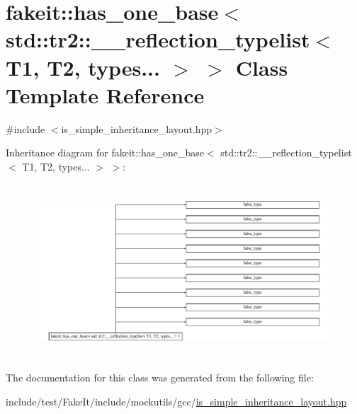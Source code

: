 \hypertarget{classfakeit_1_1has__one__base_3_01std_1_1tr2_1_1____reflection__typelist_3_01T1_00_01T2_00_01types_8_8_8_01_4_01_4}{}\section{fakeit\+::has\+\_\+one\+\_\+base$<$ std\+::tr2\+::\+\_\+\+\_\+reflection\+\_\+typelist$<$ T1, T2, types... $>$ $>$ Class Template Reference}
\label{classfakeit_1_1has__one__base_3_01std_1_1tr2_1_1____reflection__typelist_3_01T1_00_01T2_00_01types_8_8_8_01_4_01_4}


{\ttfamily \#include $<$is\+\_\+simple\+\_\+inheritance\+\_\+layout.\+hpp$>$}

Inheritance diagram for fakeit\+::has\+\_\+one\+\_\+base$<$ std\+::tr2\+::\+\_\+\+\_\+reflection\+\_\+typelist$<$ T1, T2, types... $>$ $>$\+:\begin{figure}[H]
\begin{center}
\leavevmode
\includegraphics[height=6.511628cm]{classfakeit_1_1has__one__base_3_01std_1_1tr2_1_1____reflection__typelist_3_01T1_00_01T2_00_01types_8_8_8_01_4_01_4}
\end{center}
\end{figure}


The documentation for this class was generated from the following file\+:\begin{DoxyCompactItemize}
\item 
include/test/\+Fake\+It/include/mockutils/gcc/\mbox{\hyperlink{is__simple__inheritance__layout_8hpp}{is\+\_\+simple\+\_\+inheritance\+\_\+layout.\+hpp}}\end{DoxyCompactItemize}
